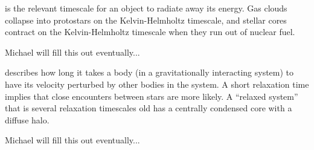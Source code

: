  is the relevant timescale for an object to
radiate away its energy.  Gas clouds collapse into protostars on the Kelvin-Helmholtz timescale,
and stellar cores contract on the Kelvin-Helmholtz timescale when they run out of nuclear fuel.

Michael will fill this out eventually...

 describes how long it takes
a body (in a gravitationally interacting system) to have its velocity perturbed by other bodies
in the system.  A short relaxation time implies that close encounters between stars are more
likely.  A ``relaxed system'' that is several relaxation timescales old has a centrally
condensed core with a diffuse halo.

Michael will fill this out eventually...

